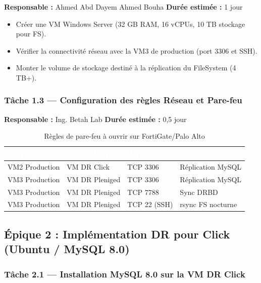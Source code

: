 \documentclass[a4paper,11pt]{article}
\begin{document}
\textbf{Responsable :} Ahmed Abd Dayem Ahmed Bouha \quad \textbf{Durée estimée :} 1 jour

\begin{itemize}[noitemsep]
  \item Créer une VM Windows Server (32 GB RAM, 16 vCPUs, 10 TB stockage pour FS).
  \item Vérifier la connectivité réseau avec la VM3 de production (port 3306 et SSH).
  \item Monter le volume de stockage destiné à la réplication du FileSystem (4 TB+).
\end{itemize}

\subsubsection{Tâche 1.3 — Configuration des règles Réseau et Pare-feu}

\textbf{Responsable :} Ing. Betah Lab \quad \textbf{Durée estimée :} 0,5 jour

\begin{table}[h!]
\centering
\renewcommand{\arraystretch}{1.3}
\begin{tabular}{|l|l|l|l|}
\hline
\rowcolor{bnmblue}\textcolor{white}{Source} & \textcolor{white}{Destination} & \textcolor{white}{Port} & \textcolor{white}{Usage} \\
\hline
VM2 Production & VM DR Click & TCP 3306 & Réplication MySQL \\
\hline
\rowcolor{bnmlightgray}
VM3 Production & VM DR Pleniged & TCP 3306 & Réplication MySQL \\
\hline
VM3 Production & VM DR Pleniged & TCP 7788 & Sync DRBD \\
\hline
\rowcolor{bnmlightgray}
VM3 Production & VM DR Pleniged & TCP 22 (SSH) & rsync FS nocturne \\
\hline
\end{tabular}
\caption{Règles de pare-feu à ouvrir sur FortiGate/Palo Alto}
\end{table}

\subsection{Épique 2 : Implémentation DR pour Click (Ubuntu / MySQL 8.0)}

\subsubsection{Tâche 2.1 — Installation MySQL 8.0 sur la VM DR Click}
\end{document}
